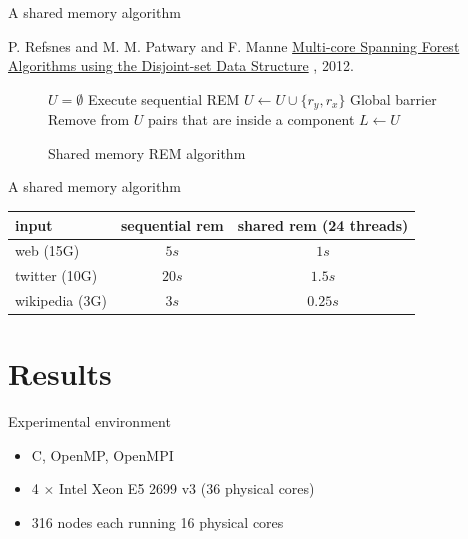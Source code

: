 \documentclass{beamer}
\begin{document}
  \begin{frame}{A shared memory algorithm}
    \begin{thebibliography}{10}
      P. Refsnes and M. M. Patwary and F. Manne
      \newblock \href{http://www.ii.uib.no/~fredrikm/fredrik/papers/sm_disjoint.pdf}{Multi-core Spanning Forest Algorithms using the Disjoint-set Data Structure}
      , 2012.
    \end{thebibliography}

    \vspace{-0.5em}

    \begin{figure}
        \centering
        \begin{minipage}{8cm}
          \begin{algorithm}[H]
            \caption{Shared memory REM algorithm}%
            \label{alg:shared_rem}
            \begin{algorithmic}[1]
                \State $U = \emptyset$
                  \State Execute sequential REM
                    \State $U \gets U \cup \{r_y, r_x\}$
                  \EndIf
                \EndFor
                \State Global barrier
                \State Remove from $U$ pairs that are inside a component
                \State $L \gets U$
              \EndWhile
            \end{algorithmic}
          \end{algorithm}
        \end{minipage}
      \end{figure}
  \end{frame}

  \begin{frame}{A shared memory algorithm}
    \begin{tabular}{|l|c|c|}
      \hline
      input & sequential rem & shared rem (24 threads) \\
      \hline
      web (15G)      & $5s$    & $1s$    \\
      twitter (10G)  & $20s$   & $1.5s$   \\
      wikipedia (3G) & $3s$    & $0.25s$ \\
      \hline
    \end{tabular}
  \end{frame}

\section{Results}
  \begin{frame}{Experimental environment}

    \begin{itemize}
      \item C, OpenMP, OpenMPI
      \item 4 $\times$ Intel Xeon E5 2699 v3 (36 physical cores)
      \item 316 nodes each running 16 physical cores
    \end{itemize}
  \end{frame}
\end{document}
